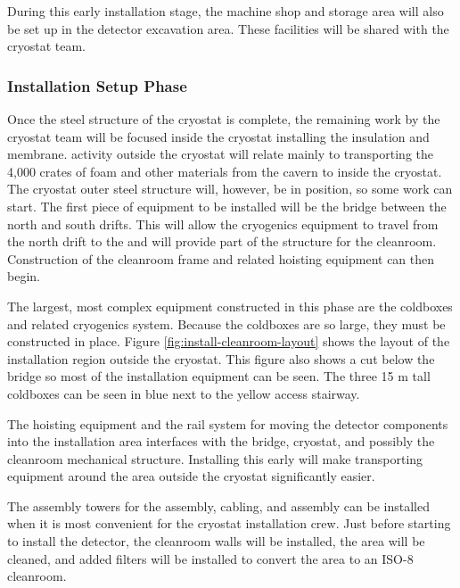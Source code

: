 During this early installation stage, the machine shop and  storage area will also be set up in the detector excavation area. These facilities will be shared with the cryostat team. 

\subsubsection{Installation Setup Phase}
\label{sec:fdsp-tc-inst-setup}

Once the steel structure of the cryostat is complete, the remaining work by the  cryostat team will be focused inside the cryostat installing the insulation and membrane.  
 activity outside the cryostat will relate mainly to transporting the 4,000 crates of foam and other materials from the cavern to inside the cryostat. The cryostat outer steel structure will, however, be in position, so some  work can start. 
The first piece of equipment to be installed will be the bridge between the north and south drifts. 
This will allow the cryogenics equipment to travel from the north drift to the  and will provide part of the structure for the cleanroom. 
Construction of the cleanroom frame and related hoisting equipment can then begin. 

The largest, most complex equipment constructed in this phase are the coldboxes and related cryogenics system. 
Because the coldboxes are so large, they must be constructed in place. 
Figure \ref{fig:install-cleanroom-layout} shows the layout of the installation region outside the cryostat. 
This figure also shows a cut below the bridge so most of the installation equipment can be seen. 
The three 15 \si{m} tall coldboxes can be seen in blue next to the yellow access stairway. 

The hoisting equipment and the rail system for moving the detector components into the installation area interfaces with the bridge, cryostat, and possibly the cleanroom mechanical structure. 
Installing this early will make transporting equipment around the area outside the cryostat significantly easier. 
 
The assembly towers for the  assembly,  cabling, and  assembly can be installed when it is most convenient for the cryostat installation crew. 
Just before starting to install the detector, the cleanroom walls will be installed, the area will be cleaned, and added filters will be installed to convert the area to an ISO-8 cleanroom.

